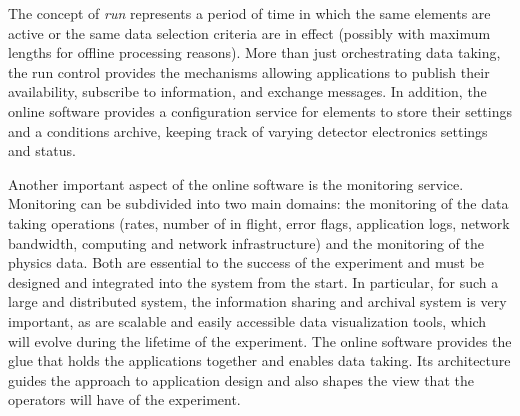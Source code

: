 The concept of \textit{run} represents a period of time in which the same
 elements are active or the same data selection criteria
are in effect (possibly with maximum lengths for offline processing
reasons). 
More than just orchestrating data taking, the run control
provides the mechanisms allowing  applications to publish
their availability, subscribe to information, and exchange messages. 
In addition, the online software provides a configuration service
for  elements to store their settings and a conditions
archive, keeping track of varying detector electronics settings and
status.

Another important aspect of the online software is the monitoring
service.
Monitoring can be subdivided into two main domains: the monitoring of
the data taking operations (rates, number of 
in flight, error flags, application logs, network bandwidth, %
computing and network infrastructure) and the monitoring of the
physics data.
Both are essential to the success of the experiment and must be %
designed and integrated into the  system from the start.
In particular, for such a large and distributed system, the information sharing and archival system is very important, as are 
scalable and easily accessible data visualization tools, which will evolve during the lifetime of the experiment.
The online software provides the glue that holds the
 applications together and enables %
data taking.
Its architecture guides the
approach to  application design and also shapes the view
that the operators will have of the experiment.

